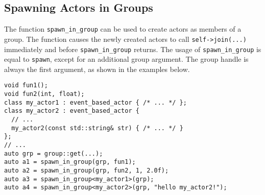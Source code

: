 \clearpage
\subsection{Spawning Actors in Groups}
\label{Sec::Group::Spawn}

The function \lstinline^spawn_in_group^ can be used to create actors as members of a group.
The function causes the newly created actors to call \lstinline^self->join(...)^ immediately and before \lstinline^spawn_in_group^ returns. 
The usage of \lstinline^spawn_in_group^ is equal to \lstinline^spawn^, except for an additional group argument.
The group handle is always the first argument, as shown in the examples below.

\begin{lstlisting}
void fun1();
void fun2(int, float);
class my_actor1 : event_based_actor { /* ... */ };
class my_actor2 : event_based_actor {
  // ...
  my_actor2(const std::string& str) { /* ... */ }
};
// ...
auto grp = group::get(...);
auto a1 = spawn_in_group(grp, fun1);
auto a2 = spawn_in_group(grp, fun2, 1, 2.0f);
auto a3 = spawn_in_group<my_actor1>(grp);
auto a4 = spawn_in_group<my_actor2>(grp, "hello my_actor2!");
\end{lstlisting}
